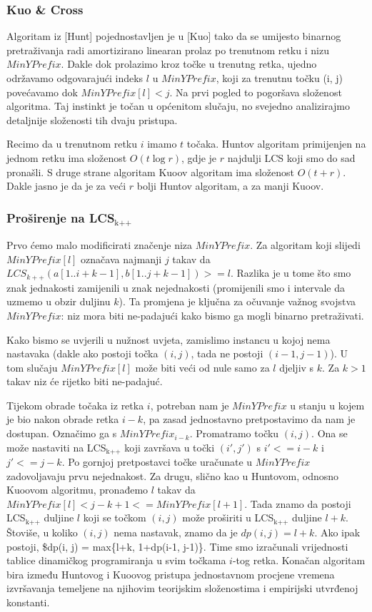 \documentclass[11pt]{article}
\begin{document}
\subsubsection{Kuo \& Cross}
\label{sec-2-2-2}
Algoritam iz [Hunt] pojednostavljen je u [Kuo] tako da se umijesto
binarnog pretraživanja radi amortizirano linearan prolaz po trenutnom
retku i nizu $MinYPrefix$. Dakle dok prolazimo kroz točke u trenutng 
retka, ujedno održavamo odgovarajući indeks $l$ u $MinYPrefix$, koji
za trenutnu točku (i, j) povećavamo dok $MinYPrefix[l] < j$. 
Na prvi pogled to pogoršava složenost algoritma. Taj instinkt je
točan u općenitom slučaju, no svejedno analizirajmo detaljnije
složenosti tih dvaju pristupa.

Recimo da u trenutnom retku $i$ imamo $t$ točaka. Huntov algoritam
primijenjen na jednom retku ima složenost $O(t \log r)$, gdje je
$r$ najdulji LCS koji smo do sad pronašli. S druge strane algoritam
Kuoov algoritam ima složenost $O(t + r)$. Dakle jasno je da je za
veći $r$ bolji Huntov algoritam, a za manji Kuoov.

\subsubsection{Proširenje na LCS$_{\text{k++}}$}
\label{sec-2-2-3}
Prvo ćemo malo modificirati značenje niza $MinYPrefix$.
Za algoritam koji slijedi $MinYPrefix[l]$ označava najmanji $j$
takav da $LCS_{k++}(a[1..i+k-1], b[1..j+k-1]) >= l$. Razlika je
u tome što smo znak jednakosti zamijenili u znak nejednakosti
(promijenili smo i intervale da uzmemo u obzir duljinu $k$). 
Ta promjena je ključna za očuvanje važnog svojstva $MinYPrefix$:
niz mora biti ne-padajući kako bismo ga mogli binarno pretraživati.

Kako bismo se uvjerili u nužnost uvjeta, zamislimo instancu u kojoj
nema nastavaka (dakle ako postoji točka $(i, j)$, tada ne postoji
$(i-1, j-1)$). U tom slučaju $MinYPrefix[l]$ može biti veći od
nule samo za $l$ djeljiv s $k$. Za $k > 1$ takav niz će rijetko
biti ne-padajuć.

Tijekom obrade točaka iz retka $i$, potreban nam je $MinYPrefix$ u
stanju u kojem je bio nakon obrade retka $i-k$, pa zasad
jednostavno pretpostavimo da nam je dostupan. Označimo ga s
$MinYPrefix_{i-k}$. Promatramo točku $(i, j)$. Ona se može
nastaviti na LCS$_{\text{k++}}$ koji završava u točki $(i', j')$ s $i' <=
    i - k$ i $j' <= j - k$. Po gornjoj pretpostavci točke uračunate u
$MinYPrefix$ zadovoljavaju prvu nejednakost. Za drugu, slično kao
u Huntovom, odnosno Kuoovom algoritmu, pronađemo $l$ takav da
$MinYPrefix[l] < j - k + 1 <= MinYPrefix[l+1]$. Tada znamo da
postoji LCS$_{\text{k++}}$ duljine $l$ koji se točkom $(i, j)$ može
proširiti u LCS$_{\text{k++}}$ duljine $l+k$. Štoviše, u koliko $(i, j)$
nema nastavak, znamo da je $dp(i, j) = l+k$.  Ako ipak postoji,
\$dp(i, j) = max\{l+k, 1+dp(i-1, j-1)\}. Time smo izračunali
vrijednosti tablice dinamičkog programiranja u svim točkama
$i$-tog retka. Konačan algoritam bira između Huntovog i Kuoovog
pristupa jednostavnom procjene vremena izvršavanja temeljene na
njihovim teorijskim složenostima i empirijski utvrđenoj konstanti.
\end{document}
